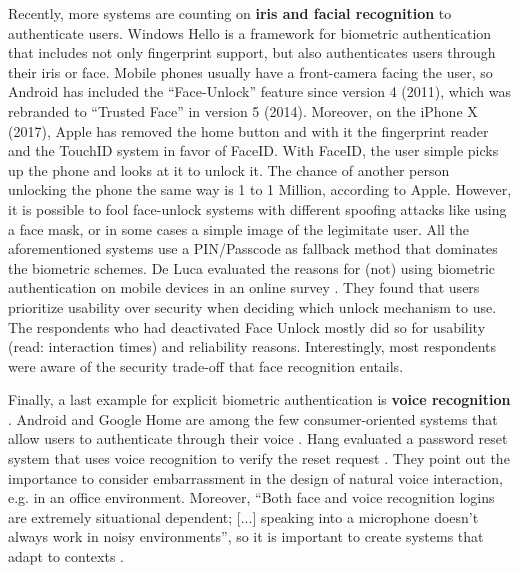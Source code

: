 	Recently, more systems are counting on \textbf{iris and facial recognition} to authenticate users. Windows Hello is a framework for biometric authentication that includes not only fingerprint support, but also authenticates users through their iris or face. Mobile phones usually have a front-camera facing the user, so Android has included the ``Face-Unlock'' feature since version 4 (2011), which was rebranded to ``Trusted Face'' in version 5 (2014). Moreover, on the iPhone X (2017), Apple has removed the home button and with it the fingerprint reader and the TouchID system in favor of FaceID. With FaceID, the user simple picks up the phone and looks at it to unlock it. The chance of another person unlocking the phone the same way is 1 to 1 Million, according to Apple. 
	However, it is possible to fool face-unlock systems with different spoofing attacks like using a face mask, or in some cases a simple image of the legimitate user. All the aforementioned systems use a PIN/Passcode as fallback method that dominates the biometric schemes. 
	De Luca \etal evaluated the reasons for (not) using biometric authentication on mobile devices in an online survey \cite{DeLuca2015Selfies}. They found that users prioritize usability over security when deciding which unlock mechanism to use. The respondents who had deactivated Face Unlock mostly did so for usability (read: interaction times) and reliability reasons. Interestingly, most respondents were aware of the security trade-off that face recognition entails.
	
	Finally, a last example for explicit biometric authentication is \textbf{voice recognition} \cite{Aleksic2006AVBiometrics}. Android and Google Home are among the few consumer-oriented systems that allow users to authenticate through their voice \ar. Hang \etal evaluated a password reset system that uses voice recognition to verify the reset request \cite{Hang2013TravelRoutes}. They point out the importance to consider embarrassment in the design of natural voice interaction, e.g. in an office environment. Moreover, ``Both face and voice recognition logins are extremely situational dependent; [...] speaking into a microphone doesn't always work in noisy environments'', so it is important to create systems that adapt to contexts \cite{Damousis2008Humabio}.
	

